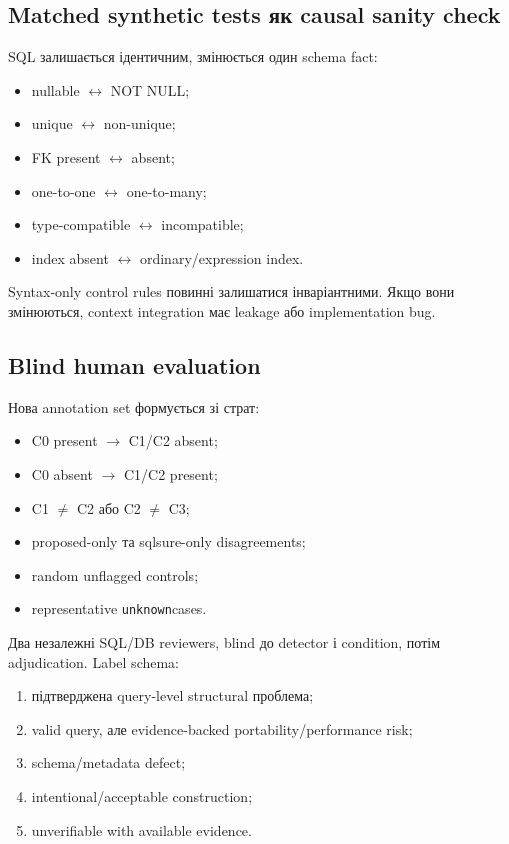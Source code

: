 \documentclass[11pt,a4paper]{article}
\newcommand{\unknown}{\texttt{unknown}}
\begin{document}
\subsection{Matched synthetic tests як causal sanity check}

SQL залишається ідентичним, змінюється один schema fact:

\begin{itemize}
\item nullable $\leftrightarrow$ NOT NULL;
\item unique $\leftrightarrow$ non-unique;
\item FK present $\leftrightarrow$ absent;
\item one-to-one $\leftrightarrow$ one-to-many;
\item type-compatible $\leftrightarrow$ incompatible;
\item index absent $\leftrightarrow$ ordinary/expression index.
\end{itemize}

Syntax-only control rules повинні залишатися інваріантними. Якщо вони змінюються,
context integration має leakage або implementation bug.

\subsection{Blind human evaluation}

Нова annotation set формується зі страт:

\begin{itemize}
\item C0 present $\rightarrow$ C1/C2 absent;
\item C0 absent $\rightarrow$ C1/C2 present;
\item C1 $\neq$ C2 або C2 $\neq$ C3;
\item proposed-only та sqlsure-only disagreements;
\item random unflagged controls;
\item representative \unknown cases.
\end{itemize}

Два незалежні SQL/DB reviewers, blind до detector і condition, потім adjudication.
Label schema:

\begin{enumerate}
\item підтверджена query-level structural проблема;
\item valid query, але evidence-backed portability/performance risk;
\item schema/metadata defect;
\item intentional/acceptable construction;
\item unverifiable with available evidence.
\end{enumerate}
\end{document}
